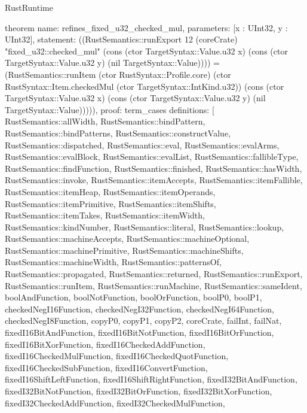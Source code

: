 \begin{lexlean}{RustRuntime}
\begin{semanticmodule}
theorem{
  name: refines_fixed_u32_checked_mul,
  parameters: [x : UInt32, y : UInt32],
  statement: ((RustSemantics::runExport 12 (coreCrate) "fixed_u32::checked_mul" (cons (ctor TargetSyntax::Value.u32 x) (cons (ctor TargetSyntax::Value.u32 y) (nil TargetSyntax::Value)))) = (RustSemantics::runItem (ctor RustSyntax::Profile.core) (ctor RustSyntax::Item.checkedMul (ctor TargetSyntax::IntKind.u32)) (cons (ctor TargetSyntax::Value.u32 x) (cons (ctor TargetSyntax::Value.u32 y) (nil TargetSyntax::Value))))),
  proof: term_cases{
    definitions: [
      RustSemantics::allWidth,
      RustSemantics::bindPattern,
      RustSemantics::bindPatterns,
      RustSemantics::constructValue,
      RustSemantics::dispatched,
      RustSemantics::eval,
      RustSemantics::evalArms,
      RustSemantics::evalBlock,
      RustSemantics::evalList,
      RustSemantics::fallibleType,
      RustSemantics::findFunction,
      RustSemantics::finished,
      RustSemantics::hasWidth,
      RustSemantics::invoke,
      RustSemantics::itemAccepts,
      RustSemantics::itemFallible,
      RustSemantics::itemHeap,
      RustSemantics::itemOperands,
      RustSemantics::itemPrimitive,
      RustSemantics::itemShifts,
      RustSemantics::itemTakes,
      RustSemantics::itemWidth,
      RustSemantics::kindNumber,
      RustSemantics::literal,
      RustSemantics::lookup,
      RustSemantics::machineAccepts,
      RustSemantics::machineOptional,
      RustSemantics::machinePrimitive,
      RustSemantics::machineShifts,
      RustSemantics::machineWidth,
      RustSemantics::patternsOf,
      RustSemantics::propagated,
      RustSemantics::returned,
      RustSemantics::runExport,
      RustSemantics::runItem,
      RustSemantics::runMachine,
      RustSemantics::sameIdent,
      boolAndFunction,
      boolNotFunction,
      boolOrFunction,
      boolP0,
      boolP1,
      checkedNegI16Function,
      checkedNegI32Function,
      checkedNegI64Function,
      checkedNegI8Function,
      copyP0,
      copyP1,
      copyP2,
      coreCrate,
      failInt,
      failNat,
      fixedI16BitAndFunction,
      fixedI16BitNotFunction,
      fixedI16BitOrFunction,
      fixedI16BitXorFunction,
      fixedI16CheckedAddFunction,
      fixedI16CheckedMulFunction,
      fixedI16CheckedQuotFunction,
      fixedI16CheckedSubFunction,
      fixedI16ConvertFunction,
      fixedI16ShiftLeftFunction,
      fixedI16ShiftRightFunction,
      fixedI32BitAndFunction,
      fixedI32BitNotFunction,
      fixedI32BitOrFunction,
      fixedI32BitXorFunction,
      fixedI32CheckedAddFunction,
      fixedI32CheckedMulFunction,
}}
\end{semanticmodule}
\end{lexlean}
